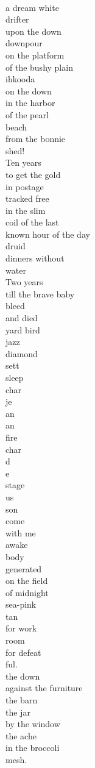 \documentclass[smalldemyvopaper,11pt,twoside,onecolumn,openright,extrafontsizes]{memoir}
\begin{document}
\\a dream white
\\drifter
\\upon the down
\\downpour
\\on the platform
\\of the bushy plain
\\ihkooda
\\on the down
\\in the harbor
\\of the pearl
\\beach
\\from the bonnie
\\shed!
\\Ten years
\\to get the gold
\\in postage
\\tracked free
\\in the slim
\\coil of the last
\\known hour of the day
\\druid
\\dinners without
\\water
\\Two years
\\till the brave baby
\\bleed
\\and died
\\yard bird
\\jazz
\\diamond
\\sett
\\sleep
\\char
\\je
\\an
\\an
\\fire
\\char
\\d
\\e
\\stage
\\us
\\son
\\come
\\with me
\\awake
\\body
\\generated
\\on the field
\\of midnight
\\sea-pink
\\tan
\\for work
\\room
\\for defeat
\\ful.
\\the down
\\against the furniture
\\the barn
\\the jar
\\by the window
\\the ache
\\in the broccoli
\\mesh.
\end{document}
